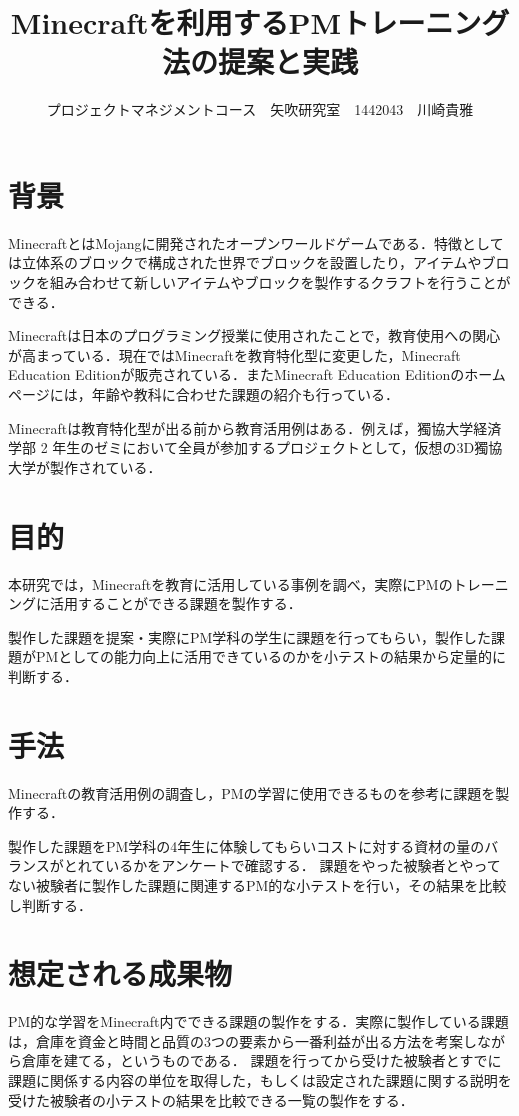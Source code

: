 \documentclass[uplatex,twocolumn,dvipdfmx]{jsarticle}
\title{\vspace{-5mm}\fontsize{14pt}{0pt}\selectfont Minecraftを利用するPMトレーニング法の提案と実践}
\author{\normalsize プロジェクトマネジメントコース　矢吹研究室　1442043　川崎貴雅}
\date{}
\begin{document}
\fontsize{10.5pt}{\baselineskip}\selectfont
\maketitle





\section{背景}

MinecraftとはMojangに開発されたオープンワールドゲームである．特徴としては立体系のブロックで構成された世界でブロックを設置したり，アイテムやブロックを組み合わせて新しいアイテムやブロックを製作するクラフトを行うことができる．


Minecraftは日本のプログラミング授業に使用されたことで，教育使用への関心が高まっている．現在ではMinecraftを教育特化型に変更した，Minecraft Education Editionが販売されている．またMinecraft Education Editionのホームページには，年齢や教科に合わせた課題の紹介も行っている\cite{self}．


Minecraftは教育特化型が出る前から教育活用例はある．例えば，獨協大学経済学部 2 年生のゼミにおいて全員が参加するプロジェクトとして，仮想の3D獨協大学が製作されている\cite{ 110009684401}．




\section{目的}
本研究では，Minecraftを教育に活用している事例を調べ，実際にPMのトレーニングに活用することができる課題を製作する．


製作した課題を提案・実際にPM学科の学生に課題を行ってもらい，製作した課題がPMとしての能力向上に活用できているのかを小テストの結果から定量的に判断する．

\section{手法}
Minecraftの教育活用例の調査し，PMの学習に使用できるものを参考に課題を製作する．

製作した課題をPM学科の4年生に体験してもらいコストに対する資材の量のバランスがとれているかをアンケートで確認する．
課題をやった被験者とやってない被験者に製作した課題に関連するPM的な小テストを行い，その結果を比較し判断する．

\section{想定される成果物}
PM的な学習をMinecraft内でできる課題の製作をする．実際に製作している課題は，倉庫を資金と時間と品質の3つの要素から一番利益が出る方法を考案しながら倉庫を建てる，というものである．
課題を行ってから受けた被験者とすでに課題に関係する内容の単位を取得した，もしくは設定された課題に関する説明を受けた被験者の小テストの結果を比較できる一覧の製作をする．
\end{document}
